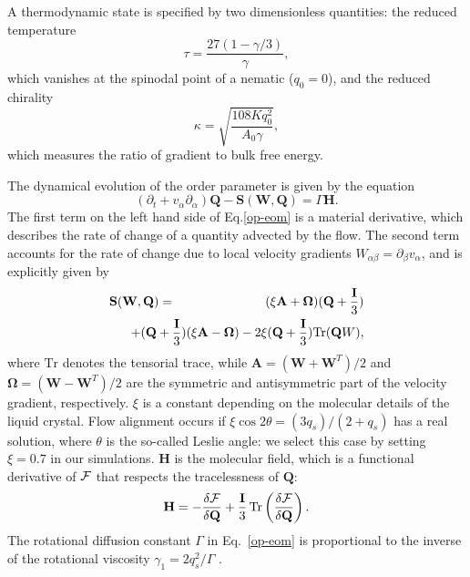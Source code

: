 \documentclass[aps,pre,reprint,superscriptaddress, twocolumn]{revtex4}
\begin{document}
A thermodynamic state is specified by two dimensionless quantities: the reduced temperature 
\begin{equation}
\tau=\frac{27(1-\gamma/3)}{\gamma},
\end{equation}
which vanishes at the spinodal point of a nematic ($q_0=0$), 
and the reduced chirality 
\begin{equation}
\kappa=\sqrt{\frac{108 K q_0^2}{A_0 \gamma}},
\end{equation}
which measures the ratio of gradient to bulk free energy.

The dynamical evolution of the order parameter is given by the equation 
\begin{equation}
\left(\partial_t+ v_\alpha \partial_\alpha \right){\mathbf Q} - {\mathbf S}({\mathbf W},{\mathbf Q}) = \Gamma {\mathbf H}.
\label{op-eom}
\end{equation}
The first term on the left hand side of Eq.\ref{op-eom} is a material derivative, which describes the rate of change of a quantity advected by the flow.
The second term accounts for the rate of change due to local velocity gradients $W_{\alpha \beta}=\partial_\beta v_\alpha$,
and is explicitly given by~\cite{Beris:1994}
\begin{eqnarray}
{\mathbf S}({\mathbf W}, {\mathbf Q}) &=& (\xi {\mathbf A} + {\boldsymbol \Omega})({\mathbf Q}+\frac{\mathbf I}{3})\nonumber\\
& &\hspace*{-1.5cm}+ ({\mathbf Q}+\frac{\mathbf I}{3})(\xi {\mathbf A}  - {\boldsymbol \Omega})-2 \xi ({\mathbf Q}+\frac{\mathbf I}{3})
\mathrm{Tr}({\mathbf Q W}),
\label{sw}
\end{eqnarray}
where $\mathrm{Tr}$ denotes the tensorial trace, while 
${\mathbf A}=({\mathbf W}+{\mathbf W}^T)/2$ and
${\boldsymbol \Omega}=({\mathbf W}-{\mathbf W}^T)/2$ are the symmetric and antisymmetric part of the velocity gradient, respectively. $\xi$ 
is a constant depending on the molecular details of the liquid crystal.
Flow alignment occurs if $\xi \cos{2\theta}=(3q_s)/(2+q_s)$ has a real solution, where $\theta$ is the 
so-called Leslie angle: we select this case by 
setting $\xi=0.7$ in our simulations.
${\mathbf H}$ is the molecular field, which is a functional derivative of $\cal F$ that respects the tracelessness of $\mathbf Q$:
\begin{equation}
{\bf H}=-\frac{\delta {\cal F}}{\delta {\bf Q}}+\frac{\bf I}{3}\,
\mathrm{Tr} \left(\frac{\delta {\cal F}}{\delta {\bf Q}}\right).
\label{molfield}
\end{equation}
The rotational diffusion constant $\Gamma$ in Eq.~\ref{op-eom} is proportional
to the inverse of the rotational viscosity $\gamma_1=2 q_s^2/\Gamma$
\cite{deGennes}.
\end{document}
